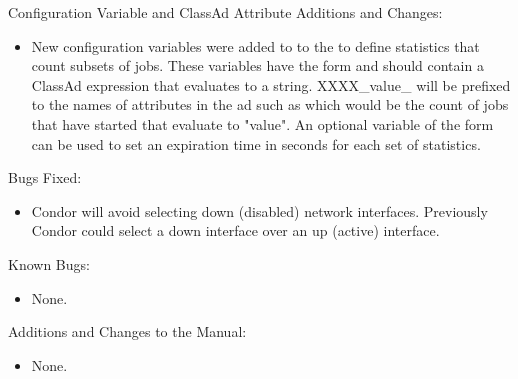 \noindent Configuration Variable and ClassAd Attribute Additions and Changes:

\begin{itemize}

\item New configuration variables were added to to the  to
define statistics that count subsets of jobs. These variables
have the form  and should contain
a ClassAd expression that evaluates to a string.
XXXX_value_ will be prefixed to the names of attributes in the  ad
such as  which would be the count of jobs that have
started that evaluate to "value".  An optional variable of the form
 can be used to set an expiration time in seconds
for each set of statistics.

\end{itemize}

\noindent Bugs Fixed:

\begin{itemize}

\item Condor will avoid selecting down (disabled) network interfaces.  Previously Condor could select a down interface over an up (active) interface.

\end{itemize}

\noindent Known Bugs:

\begin{itemize}

\item None.

\end{itemize}

\noindent Additions and Changes to the Manual:

\begin{itemize}

\item None.

\end{itemize}


